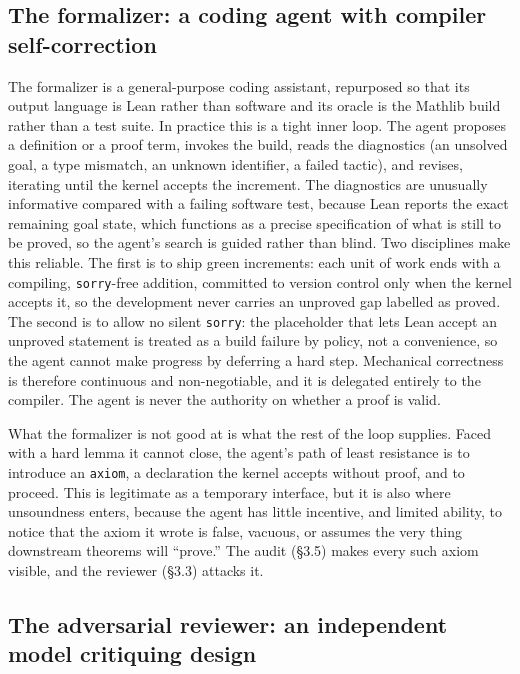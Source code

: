 \documentclass[11pt]{article}
\begin{document}
\subsection{The formalizer: a coding agent with compiler self-correction}

The formalizer is a general-purpose coding assistant, repurposed so that its output language is Lean
rather than software and its oracle is the Mathlib build rather than a test suite. In practice this
is a tight inner loop. The agent proposes a definition or a proof term, invokes the build, reads the
diagnostics (an unsolved goal, a type mismatch, an unknown identifier, a failed tactic), and
revises, iterating until the kernel accepts the increment. The diagnostics are unusually informative
compared with a failing software test, because Lean reports the exact remaining goal state, which
functions as a precise specification of what is still to be proved, so the agent's search is guided
rather than blind. Two disciplines make this reliable. The first is to ship green increments: each
unit of work ends with a compiling, \texttt{sorry}-free addition, committed to version control only
when the kernel accepts it, so the development never carries an unproved gap labelled as proved. The
second is to allow no silent \texttt{sorry}: the placeholder that lets Lean accept an unproved
statement is treated as a build failure by policy, not a convenience, so the agent cannot make
progress by deferring a hard step. Mechanical correctness is therefore continuous and
non-negotiable, and it is delegated entirely to the compiler. The agent is never the authority on
whether a proof is valid.

What the formalizer is not good at is what the rest of the loop supplies. Faced with a hard lemma it
cannot close, the agent's path of least resistance is to introduce an \texttt{axiom}, a declaration
the kernel accepts without proof, and to proceed. This is legitimate as a temporary interface, but
it is also where unsoundness enters, because the agent has little incentive, and limited ability, to
notice that the axiom it wrote is false, vacuous, or assumes the very thing downstream theorems will
``prove.'' The audit (\S3.5) makes every such axiom visible, and the reviewer (\S3.3) attacks it.

\subsection{The adversarial reviewer: an independent model critiquing design}
\end{document}
